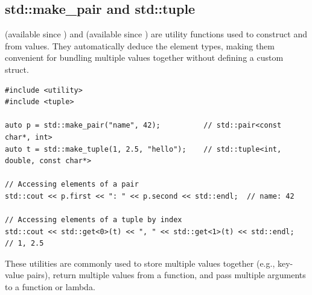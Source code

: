 \subsection{std::make\_pair and std::tuple}
 (available since ) and  (available since ) are utility functions used to construct  and  from values. They automatically deduce the element types, making them convenient for bundling multiple values together without defining a custom struct.
\begin{lstlisting}
#include <utility>
#include <tuple>

auto p = std::make_pair("name", 42);          // std::pair<const char*, int>
auto t = std::make_tuple(1, 2.5, "hello");    // std::tuple<int, double, const char*>

// Accessing elements of a pair
std::cout << p.first << ": " << p.second << std::endl;  // name: 42

// Accessing elements of a tuple by index
std::cout << std::get<0>(t) << ", " << std::get<1>(t) << std::endl;  // 1, 2.5
\end{lstlisting}
These utilities are commonly used to store multiple values together (e.g., key-value pairs), return multiple values from a function, and pass multiple arguments to a function or lambda.


